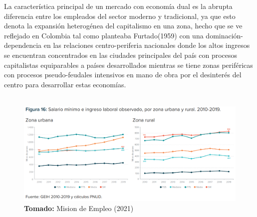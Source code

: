 \documentclass[12pt,letterpaper]{article}
\newcommand*{\captionsource}[2]{%
    \textbf{\\Tomado:} #2%
  }%
\begin{document}
\begin{flushleft}

La característica principal de un mercado con economía dual es la abrupta diferencia entre los empleados del sector moderno y tradicional, ya que esto denota
la expansión heterogénea del capitalismo en una zona, hecho que se ve reflejado en Colombia tal como planteaba Furtado(1959) con una dominación-dependencia en las relaciones centro-periferia nacionales
donde los altos ingresos se encuentran concentrados en las ciudades principales del país con procesos capitalistas equiparables a países desarrollados mientras 
se tiene zonas periféricas con procesos pseudo-feudales intensivos en mano de obra por el desinterés del centro para desarrollar estas economías.\\ 
~\\
\begin{figure}[h!]
    \centering
    \includegraphics[width=\linewidth]{ingcentro-perisferia.png}
    \captionsource{Caption}{Mision de Empleo (2021)}
\end{figure}


\end{flushleft}
\end{document}
